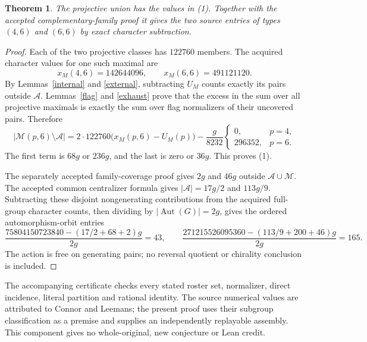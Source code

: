 \documentclass[11pt,a4paper]{article}
\newtheorem{theorem}[lemma]{Theorem}
\begin{document}
\begin{theorem}
The projective union has the values in (1). Together with the
accepted complementary-family proof it gives the two source
entries of types $(4,6)$ and $(6,6)$ by exact character subtraction.
\end{theorem}
\begin{proof}
Each of the two projective classes has $122760$ members. The
acquired character values for one such maximal are
\[
x_M(4,6)=142644096,\qquad x_M(6,6)=491121120.
\]
By Lemmas~\ref{internal} and \ref{external}, subtracting $U_M$
counts exactly its pairs outside $\mathcal A$. Lemmas~\ref{flag}
and \ref{exhaust} prove that the excess in the sum over all
projective maximals is exactly the sum over flag normalizers of
their uncovered pairs. Therefore
\[
|\mathcal M(p,6)\setminus\mathcal A|
=2\cdot122760\bigl(x_M(p,6)-U_M(p)\bigr)
-\frac{g}{8232}\begin{cases}0,&p=4,\\296352,&p=6.\end{cases}
\]
The first term is $68g$ or $236g$, and the last is zero or $36g$.
This proves (1).

The separately accepted family-coverage proof gives $2g$ and
$46g$ outside $\mathcal A\cup\mathcal M$. The accepted common
centralizer formula gives $|\mathcal A|=17g/2$ and $113g/9$.
Subtracting these disjoint nongenerating contributions from the
acquired full-group character counts, then dividing by
$|\operatorname{Aut}(G)|=2g$, gives the ordered automorphism-orbit
entries
\[
 \frac{75804150723840-(17/2+68+2)g}{2g}=43,\qquad
 \frac{271215526095360-(113/9+200+46)g}{2g}=165.
\]
The action is free on generating pairs; no reversal
quotient or chirality conclusion is included.
\end{proof}

The accompanying certificate checks every stated roster set,
normalizer, direct incidence, literal partition and rational
identity. The source numerical values are attributed to Connor
and Leemans; the present proof uses their subgroup classification
as a premise and supplies an independently replayable assembly.
This component gives no whole-original, new conjecture or Lean credit.
\end{document}
